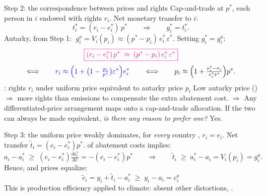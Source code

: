 \documentclass[aspectratio=169,xcolor=dvipsnames, 11pt,mathserif]{beamer}
\newcommand{\eed}{\ee\vspace{-\dimexpr 2\topsep+\parskip+\medskipamount-3pt\relax}}
\begin{document}
\begin{frame}{Step 2: the correspondence between prices and rights\label{correspondence}}
\small
\bbvs
\ip Cap-and-trade at $p^*$, each person in $i$ endowed with rights $r_i$. Net monetary transfer to $i$:
\[ t_i^* = (r_i - e_i^*)\,p^* %
\qquad\Longrightarrow\qquad g_i^* = t_i^*. \]
\eed
\bbvsp
\ip Autarky, from Step 1: $\;g_i^a = V_i(p_i) \approx (p^*-p_i)\,e_i^*\,\varepsilon^*$. \quad Setting $g_i^*=g_i^a$:
\[ \textcolor{magenta}{\boxed{(r_i-e_i^*)\,p^* \;\approx\; (p^*-p_i)\,e_i^*\,\varepsilon^*}} \]
\[ \Longleftrightarrow\qquad
   \textcolor{blue}{r_i \approx \Bigl(1+\bigl(1-\tfrac{p_i}{p^*}\bigr)\varepsilon^*\Bigr)e_i^*}
   \qquad\Longleftrightarrow\qquad
   p_i \approx \Bigl(1+\tfrac{e_i^*-r_i}{e_i^*\varepsilon^*}\Bigr)p^*. \]
\eed
\bbvsp
\ip {}: rights $r_i$ under uniform price equivalent to  autarky price $p_i$
  \bbvs
  \ip Low autarky price () $\Rightarrow$ more rights than emissions  to compensate the extra abatement cost.
  \ee
\ip $\Rightarrow$ Any differentiated-price arrangement maps onto a cap-and-trade allocation.
\ip If the two can always be made equivalent, \textit{is there any reason to prefer one?} \quad Yes.
\ee
\end{frame}


\begin{frame}{Step 3: the uniform price weakly dominates, for \textit{every} country\label{efficiency}}
\bbvs
\ip {}, $r_i = e_i$. Net transfer $\tilde t_i = (e_i-e_i^*)p^*$.
\ip {} of abatement costs implies:
\[ a_i - a_i^* \;\geq\; (e_i-e_i^*)\tfrac{da_i^*}{de} = -(e_i-e_i^*)p^*
\qquad\Longrightarrow\qquad \tilde t_i \;\geq\; a_i^*-a_i = V_i(p_i) = g_i^a. \]
\eed
\bbvsp
\ip Hence,  and prices equalize:
\[ \boxed{\;\tilde c_i = y_i + \tilde t_i - a_i^* \;\geq\; y_i - a_i = c_i^a\;}  \]
\eed
\bbvsp
\ip This is  production efficiency applied to climate: absent other distortions, .
\ee
\end{frame}
\end{document}
